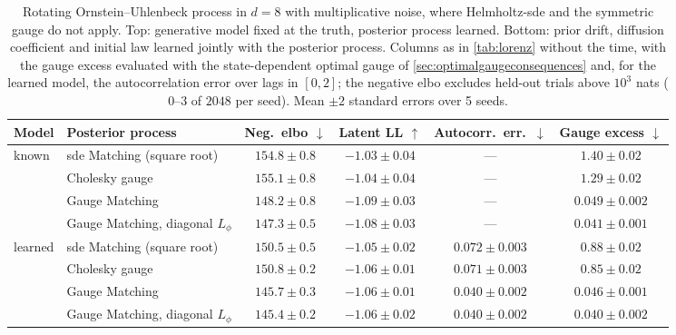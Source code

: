 \documentclass{article} %
\begin{document}
\begin{table}[t]
    \centering
    \caption{Rotating Ornstein--Uhlenbeck process in $d = 8$ with multiplicative noise, where Helmholtz-\gls{sde} and the symmetric gauge do not apply. Top: generative model fixed at the truth, posterior process learned. Bottom: prior drift, diffusion coefficient and initial law learned jointly with the posterior process. Columns as in \cref{tab:lorenz} without the time, with the gauge excess evaluated with the state-dependent optimal gauge of \cref{sec:optimalgaugeconsequences} and, for the learned model, the autocorrelation error over lags in $[0, 2]$; the negative \gls{elbo} excludes held-out trials above $10^3$ nats ($0$--$3$ of $2048$ per seed). Mean $\pm 2$ standard errors over 5 seeds.}
    \label{tab:rousd}
    \small
    \setlength{\tabcolsep}{3pt}
    \begin{tabular}{llcccc}
        \toprule
        Model & Posterior process & Neg.\ \gls{elbo} $\downarrow$ & Latent LL $\uparrow$ & Autocorr.\ err.\ $\downarrow$ & Gauge excess $\downarrow$ \\
        \midrule
        \multirow{4}{*}{known}
        & \gls{sde} Matching (square root) & $154.8 \pm 0.8$ & $-1.03 \pm 0.04$ & --- & $1.40 \pm 0.02$ \\
        & Cholesky gauge & $155.1 \pm 0.8$ & $-1.04 \pm 0.04$ & --- & $1.29 \pm 0.02$ \\
        & Gauge Matching & $148.2 \pm 0.8$ & $-1.09 \pm 0.03$ & --- & $0.049 \pm 0.002$ \\
        & Gauge Matching, diagonal $L_\phi$ & $147.3 \pm 0.5$ & $-1.08 \pm 0.03$ & --- & $0.041 \pm 0.001$ \\
        \midrule
        \multirow{4}{*}{learned}
        & \gls{sde} Matching (square root) & $150.5 \pm 0.5$ & $-1.05 \pm 0.02$ & $0.072 \pm 0.003$ & $0.88 \pm 0.02$ \\
        & Cholesky gauge & $150.8 \pm 0.2$ & $-1.06 \pm 0.01$ & $0.071 \pm 0.003$ & $0.85 \pm 0.02$ \\
        & Gauge Matching & $145.7 \pm 0.3$ & $-1.06 \pm 0.01$ & $0.040 \pm 0.002$ & $0.046 \pm 0.001$ \\
        & Gauge Matching, diagonal $L_\phi$ & $145.4 \pm 0.2$ & $-1.06 \pm 0.02$ & $0.040 \pm 0.002$ & $0.040 \pm 0.002$ \\
        \bottomrule
    \end{tabular}
\end{table}
\end{document}
